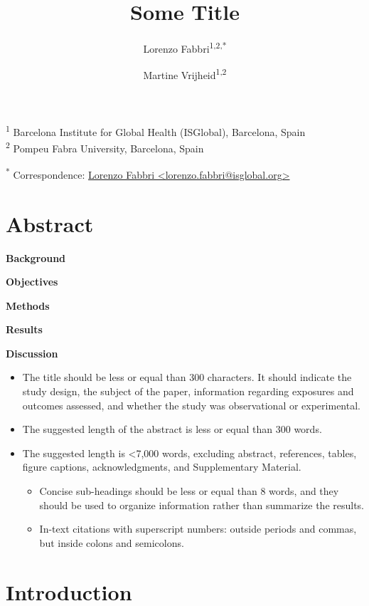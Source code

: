 \documentclass[
  letterpaper,
  DIV=11,
  numbers=noendperiod]{scrartcl}
\title{Some Title}
\author{Lorenzo Fabbri\textsuperscript{1,2,*} \and Martine
Vrijheid\textsuperscript{1,2}}
\date{}
\providecommand{\tightlist}{%
  \setlength{\itemsep}{0pt}\setlength{\parskip}{0pt}}\usepackage{longtable,booktabs,array}
\begin{document}
\maketitle
\linenumbers

\textsuperscript{1} Barcelona Institute for Global Health (ISGlobal),
Barcelona, Spain\\
\textsuperscript{2} Pompeu Fabra University, Barcelona, Spain

\textsuperscript{*} Correspondence:
\href{mailto:lorenzo.fabbri@isglobal.org}{Lorenzo Fabbri
\textless{}lorenzo.fabbri@isglobal.org\textgreater{}}

\section*{Abstract}\label{abstract}

\textbf{Background}

\textbf{Objectives}

\textbf{Methods}

\textbf{Results}

\textbf{Discussion}

\newpage

\begin{itemize}
\tightlist
\item
  The title should be less or equal than 300 characters. It should
  indicate the study design, the subject of the paper, information
  regarding exposures and outcomes assessed, and whether the study was
  observational or experimental.
\item
  The suggested length of the abstract is less or equal than 300 words.
\item
  The suggested length is \textless7,000 words, excluding abstract,
  references, tables, figure captions, acknowledgments, and
  Supplementary Material.

  \begin{itemize}
  \tightlist
  \item
    Concise sub-headings should be less or equal than 8 words, and they
    should be used to organize information rather than summarize the
    results.
  \item
    In-text citations with superscript numbers: outside periods and
    commas, but inside colons and semicolons.
  \end{itemize}
\end{itemize}

\section{Introduction}\label{sec-intro}
\end{document}
